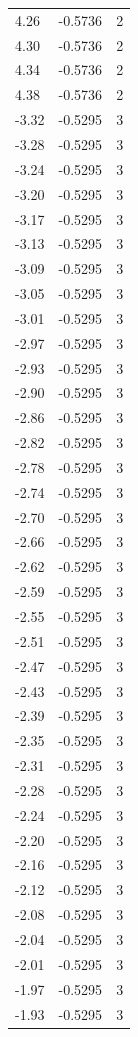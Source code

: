 \begin{longtable}{lrr}
  4.26 & -0.5736 & 2 \\
  4.30 & -0.5736 & 2 \\
  4.34 & -0.5736 & 2 \\
  4.38 & -0.5736 & 2 \\
  -3.32 & -0.5295 & 3 \\
  -3.28 & -0.5295 & 3 \\
  -3.24 & -0.5295 & 3 \\
  -3.20 & -0.5295 & 3 \\
  -3.17 & -0.5295 & 3 \\
  -3.13 & -0.5295 & 3 \\
  -3.09 & -0.5295 & 3 \\
  -3.05 & -0.5295 & 3 \\
  -3.01 & -0.5295 & 3 \\
  -2.97 & -0.5295 & 3 \\
  -2.93 & -0.5295 & 3 \\
  -2.90 & -0.5295 & 3 \\
  -2.86 & -0.5295 & 3 \\
  -2.82 & -0.5295 & 3 \\
  -2.78 & -0.5295 & 3 \\
  -2.74 & -0.5295 & 3 \\
  -2.70 & -0.5295 & 3 \\
  -2.66 & -0.5295 & 3 \\
  -2.62 & -0.5295 & 3 \\
  -2.59 & -0.5295 & 3 \\
  -2.55 & -0.5295 & 3 \\
  -2.51 & -0.5295 & 3 \\
  -2.47 & -0.5295 & 3 \\
  -2.43 & -0.5295 & 3 \\
  -2.39 & -0.5295 & 3 \\
  -2.35 & -0.5295 & 3 \\
  -2.31 & -0.5295 & 3 \\
  -2.28 & -0.5295 & 3 \\
  -2.24 & -0.5295 & 3 \\
  -2.20 & -0.5295 & 3 \\
  -2.16 & -0.5295 & 3 \\
  -2.12 & -0.5295 & 3 \\
  -2.08 & -0.5295 & 3 \\
  -2.04 & -0.5295 & 3 \\
  -2.01 & -0.5295 & 3 \\
  -1.97 & -0.5295 & 3 \\
  -1.93 & -0.5295 & 3 \\

\end{longtable}
